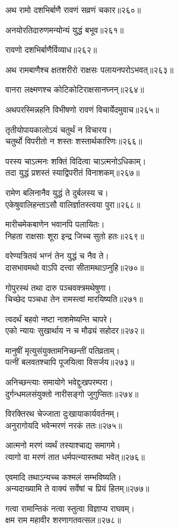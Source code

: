 \begin{flushleft}
अथ रामो दशभिर्बाणै रावणं सव्रणं चकार॥२६०॥

अनयोरतिदारुणमन्योन्यं युद्धं बभूव॥२६१॥

रावणो दशभिर्बाणैर्विव्याध॥२६२॥

अथ रामबाणैश्च क्षतशरीरो राक्षसः पलायनपरोऽभवत्॥२६३॥

वानरा लक्ष्मणश्च कोटिकोटिराक्षसानघ्नन्॥२६४॥

अथपरस्मिन्नहनि विभीषणो रावणं विचार्येदमुवाच॥२६५॥

तृतीयोपायकालोऽयं चतुर्थं न विचारय।\\
चतुर्थो विपरीतो न शस्तः शस्तार्थकारिणः॥२६६॥

परस्य चाऽत्मनः शक्तिं विदित्वा चाऽत्मनोऽधिकाम्।\\
तदा युद्धं प्रशस्तं स्याद्विपरीतं विनाशकम्॥२६७॥

रामेण बलिनानैव युद्धं ते दुर्बलस्य च।\\
एकेषुवालिहन्ताऽसौ वालिर्ज्ञातस्त्वया पुरा॥२६८॥

मारीचमेकबाणेन भवानपि पलायितः।\\
निहता राक्षसाः शूरा इन्द्र जिच्च सुतो हतः॥२६९॥

वरेण्यत्रितयं भग्नं तेन युद्धं च नैव ते।\\
दासभावमथो वाऽपि दत्त्वा सीतामथाऽप्नुहि॥२७०॥

गोपुरस्थं तथा दारु पञ्चवक्त्रमथेषुणा।\\
चिच्छेद पञ्चधा तेन रामस्त्वां मारयिष्यति॥२७१॥

त्वदर्थं बहवो नष्टा नाशमेष्यन्ति चापरे।\\
एको न्यायः सुखार्थाय न च मौढ्यं सहोदर॥२७२॥

मानुषीं मृत्युसंयुक्तामनिच्छन्तीं पतिव्रताम्।\\
पत्नीं बलवतश्चापि पूजयित्वा विसर्जय॥२७३॥

अनिच्छन्त्याः समायोगे भवेद्दुःखपरम्परा।\\
दुर्गन्धमलसंयुक्तो नारीसङ्गो जुगुप्सितः॥२७४॥

विरक्तिरथ चेज्जाता दुःखायाकार्यवर्तनम्।\\
अनुरागोयदि भवेन्मरणं नरकं ततः॥२७५॥

आत्मनो मरणं व्यर्थं तस्याश्चाद्य समागमे।\\
त्यागो वा मरणं तात धर्मपत्न्यास्तथा भवेत्॥२७६॥

एवमादि तथाऽन्यच्च कश्मलं सम्भविष्यति।\\
अन्यदाख्यामि ते वाक्यं सर्वेषां च प्रियं हितम्॥२७७॥

गत्वा रामान्तिकं नत्वा स्तुत्वा विज्ञाप्य राघवम्।\\
क्षम राम महावीर शरणागतवत्सल॥२७८॥


\end{flushleft}
